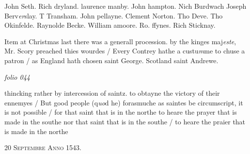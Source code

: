 \documentclass[12pt, a4paper]{book}
\begin{document}
	
		
		\ifthenelse{\isodd{\thepage}}
		{\reversemarginpar}
		{\normalmarginpar}
		
			John Seth. Rich dryland. laurence manby. John hampton. Nich Burdwach
				Joseph Berv\textit{er}slay. T Transham. John pellayne. Clement Norton.
				Tho Deve. Tho Okinfelde. Raynolde Becke. William amoore. Ro. ffynes. Rich Sticknay.
			
		
	
	
		
		\ifthenelse{\isodd{\thepage}}
		{\reversemarginpar}
		{\normalmarginpar}
		Item at Christmas last there was a generall
			procession. by the kinges maj\textit{este}, Mr. Scory preached
			thies wourdes / Every Contrey hathe a custu\textit{m}me
			to chuse a patron / as England hath chosen 
			saint George. Scotland saint Andrewe.
			
	



\dotfill
						\newpage
{}

\textit{folio 044}


	
		
				\marginpar[\vspace{0.5cm}{\textcolor{Gray}{seditious}}]{}
			
		
		\ifthenelse{\isodd{\thepage}}
		{\reversemarginpar}
		{\normalmarginpar}
		
			thincking rather by intercession of saintz. to
				obtayne the victory of their ennemyes / But
				good people (q\textit{uo}d he) forasmuche as saintes be
				circumscript, it is not possible / for that saint that is in the
				northe to heare the prayer that is made in the southe nor that saint
				that is in the southe / to heare the praier that is made in the
				northe
			
		
	
 

            
            
               
				\begin{center} \begin{large} {\scshape 
                  20 Septembre Anno 1543.} \end{large} \end{center}
			
\end{document}
